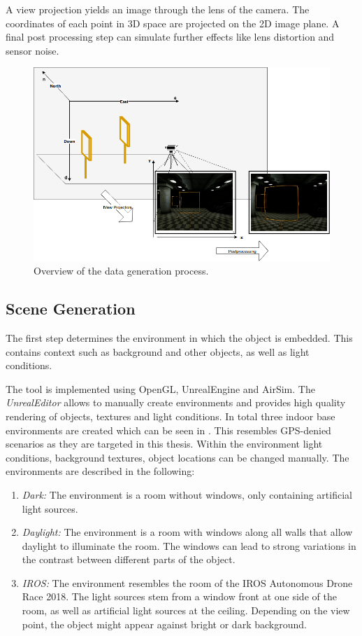 A view projection yields an image through the lens of the camera. The coordinates of each point in 3D space are projected on the 2D image plane. A final post processing step can simulate further effects like lens distortion and sensor noise.

\begin{figure}[htbp]
	\centering
	\includegraphics[width=\textwidth]{fig/datagen_notation}
	\caption{Overview of the data generation process.}
	\label{fig:training:datagen_notation}
\end{figure}

\subsection{Scene Generation}
\label{sec:training:scene}

The first step determines the environment in which the object is embedded. This contains context such as background and other objects, as well as light conditions.

The tool is implemented using OpenGL, UnrealEngine and AirSim. The \textit{UnrealEditor} allows to manually create environments and provides high quality rendering of objects, textures and light conditions. In total three indoor base environments are created which can be seen in . This resembles \ac{GPS}-denied scenarios as they are targeted in this thesis. Within the environment light conditions, background textures, object locations can be changed manually. The environments are described in the following:

\begin{enumerate}
	\item \textit{Dark:} The environment is a room without windows, only containing artificial light sources. 
	\item \textit{Daylight:} The environment is a room with windows along all walls that allow daylight to illuminate the room. The windows can lead to strong variations in the contrast between different parts of the object.
	\item \textit{IROS:} The environment resembles the room of the \ac{IROS} Autonomous Drone Race 2018. The light sources stem from a window front at one side of the room, as well as artificial light sources at the ceiling. Depending on the view point, the object might appear against bright or dark background.
\end{enumerate}

